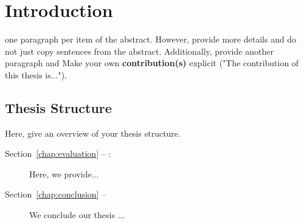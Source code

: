 
\section{Introduction}
one paragraph per item of the abstract. However, provide more details and do not just copy sentences from the abstract. 
Additionally, provide  another paragraph and  Make your own \textbf{contribution(s)} explicit ("The contribution of this thesis is...").


\subsection*{Thesis Structure}
Here, give an overview of your thesis structure.
\begin{description}
\item[Section~\ref{chap:evaluation} -- :] Here, we provide...
\item[Section~\ref{chap:conclusion} -- ] We conclude our thesis ...
\end{description}
